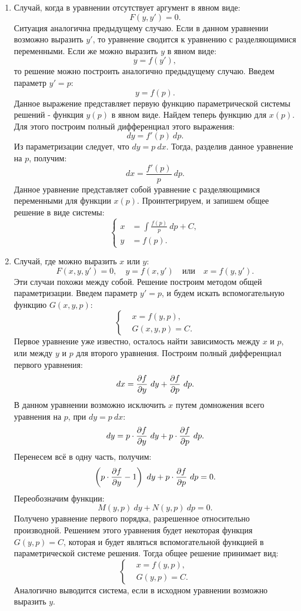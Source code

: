 \begin{enumerate}
		\item Случай, когда в уравнении отсутствует аргумент в явном виде:
			\[ F(y, y') = 0. \]
			Ситуация аналогична предыдущему случаю. Если в данном уравнении возможно выразить $y'$, то уравнение сводится к уравнению с разделяющимися переменными. Если же можно выразить $y$ в явном виде:
			\[ y = f(y'), \]
			то решение можно построить аналогично предыдущему случаю. Введем параметр $y' = p$:
			\[ y = f(p). \]
			Данное выражение представляет первую функцию параметрической системы решений - функция $y(p)$ в явном виде. Найдем теперь функцию для $x(p)$. Для этого построим полный дифференциал этого выражения:
			\[ dy = f'(p) ~ dp. \]
			Из параметризации следует, что $dy = p ~ dx$. Тогда, разделив данное уравнение на $p$, получим:
			\[ dx = \frac{f'(p)}{p} ~ dp. \]
			Данное уравнение представляет собой уравнение с разделяющимися переменными для функции $x(p)$. Проинтегрируем, и запишем общее решение в виде системы:
			\[ \left\lbrace \begin{split} x &= \int \frac{f(p)}{p} ~ dp + C, \\ y &= f(p). \end{split} \right. \]

		\item Случай, где можно выразить $x$ или $y$:
			\[ F(x, y, y') = 0, \quad y = f(x, y') \quad \text{или} \quad x = f(y, y'). \]
			Эти случаи похожи между собой. Решение построим методом общей параметризации. Введем параметр $y' = p$, и будем искать вспомогательную функцию $G(x, y, p)$:
			\[ \left\lbrace \begin{split} &x = f(y, p), \\ &G(x, y, p) = C. \end{split} \right. \]
			Первое уравнение уже известно, осталось найти зависимость между $x$ и $p$, или между $y$ и $p$ для второго уравнения. Построим полный дифференциал первого уравнения:
			\[ dx = \dfrac{\partial f}{\partial y} ~ dy + \dfrac{\partial f}{\partial p} ~ dp. \]
			В данном уравнении возможно исключить $x$ путем домножения всего уравнения на $p$, при $dy = p ~ dx$:
			\[ dy = p \cdot \dfrac{\partial f}{\partial y} ~ dy + p \cdot \dfrac{\partial f}{\partial p} ~ dp. \]
			Перенесем всё в одну часть, получим:
			\[ \left( p \cdot \dfrac{\partial f}{\partial y} - 1 \right) ~ dy + p \cdot \dfrac{\partial f}{\partial p} ~ dp = 0. \]
			Переобозначим функции:
			\[ M(y, p) ~ dy + N(y, p) ~ dp = 0. \]
			Получено уравнение первого порядка, разрешенное относительно производной. Решением этого уравнения будет некоторая функция $G(y, p) = C$, которая и будет являться вспомогательной функцией в параметрической системе решения. Тогда общее решение принимает вид:
			\[ \left\lbrace \begin{split} &x = f(y, p), \\ &G(y, p) = C. \end{split} \right. \]
			Аналогично выводится система, если в исходном уравнении возможно выразить $y$.

	\end{enumerate}

